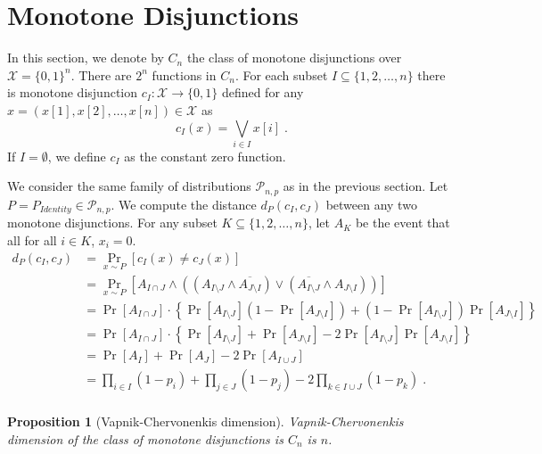 \documentclass[10pt]{article}
\newtheorem{proposition}{Proposition}
\renewcommand{\P}{\mathcal{P}}
\newcommand{\X}{\mathcal{X}}
\begin{document}
\section{Monotone Disjunctions}

In this section, we denote by $C_n$ the class of monotone disjunctions over $\X = \{0,1\}^n$. There
are $2^n$ functions in $C_n$. For each subset $I \subseteq \{1,2,\dots,n\}$
there is monotone disjunction $c_I:\X \to \{0,1\}$ defined for any $x = (x[1],
x[2], \dots, x[n]) \in \X$ as
$$
c_I(x) = \bigvee_{i \in I} x[i] \; .
$$
If $I = \emptyset$, we define $c_I$ as the constant zero function.

We consider the same family of distributions $\P_{n,p}$ as in the previous section.
Let $P = P_{Identity} \in \P_{n,p}$. We compute the distance $d_P(c_I, c_J)$ between
any two monotone disjunctions. For any subset $K \subseteq \{1,2,\dots,n\}$, let
$A_K$ be the event that all for all $i \in K$, $x_i = 0$.
\begin{align*}
d_P(c_I, c_J)
& = \Pr_{x \sim P}[c_I(x) \neq c_J(x)] \\
& = \Pr_{x \sim P}[A_{I \cap J} \wedge ((A_{I \setminus J} \wedge \overline{A_{J \setminus I}}) \vee (\overline{A_{I \setminus J}} \wedge A_{J \setminus I} )) ] \\
& = \Pr[A_{I \cap J}] \cdot \left\{ \Pr[A_{I \setminus J}] (1 - \Pr[A_{J \setminus I}]) + (1 - \Pr[A_{I \setminus J}]) \Pr[A_{J \setminus I}] \right\} \\
& = \Pr[A_{I \cap J}] \cdot \left\{ \Pr[A_{I \setminus J}] + \Pr[A_{J \setminus I}] - 2 \Pr[A_{I \setminus J}] \Pr[A_{J \setminus I}] \right\} \\
& = \Pr[A_I] + \Pr[A_J] - 2 \Pr[A_{I \cup J}] \\
& = \prod_{i \in I} (1 - p_i) + \prod_{j \in J} (1 - p_j) - 2 \prod_{k \in I \cup J} (1 - p_k) \; . \\
\end{align*}

\begin{proposition}[Vapnik-Chervonenkis dimension]
Vapnik-Chervonenkis dimension of the class of monotone disjunctions is $C_n$ is $n$.
\end{proposition}
\end{document}
